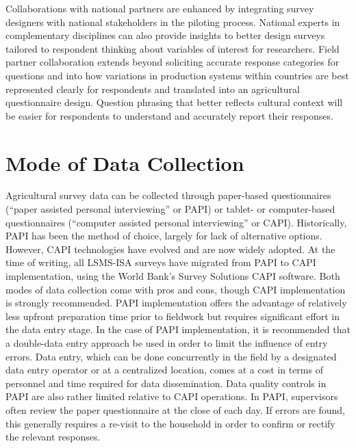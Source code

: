 \documentclass[
]{book}
\begin{document}
Collaborations with national partners are enhanced by integrating survey designers with national stakeholders in the piloting process. National experts in complementary disciplines can also provide insights to better design surveys tailored to respondent thinking about variables of interest for researchers. Field partner collaboration extends beyond soliciting accurate response categories for questions and into how variations in production systems within countries are best represented clearly for respondents and translated into an agricultural questionnaire design. Question phrasing that better reflects cultural context will be easier for respondents to understand and accurately report their responses.

\hypertarget{mode-of-data-collection}{%
\section{Mode of Data Collection}\label{mode-of-data-collection}}

Agricultural survey data can be collected through paper-based questionnaires (``paper assisted personal interviewing'' or PAPI) or tablet- or computer-based questionnaires (``computer assisted personal interviewing'' or CAPI). Historically, PAPI has been the method of choice, largely for lack of alternative options. However, CAPI technologies have evolved and are now widely adopted. At the time of writing, all LSMS-ISA surveys have migrated from PAPI to CAPI implementation, using the World Bank's Survey Solutions CAPI software. Both modes of data collection come with pros and cons, though CAPI implementation is strongly recommended. PAPI implementation offers the advantage of relatively less upfront preparation time prior to fieldwork but requires significant effort in the data entry stage. In the case of PAPI implementation, it is recommended that a double-data entry approach be used in order to limit the influence of entry errors. Data entry, which can be done concurrently in the field by a designated data entry operator or at a centralized location, comes at a cost in terms of personnel and time required for data dissemination. Data quality controls in PAPI are also rather limited relative to CAPI operations. In PAPI, supervisors often review the paper questionnaire at the close of each day. If errors are found, this generally requires a re-visit to the household in order to confirm or rectify the relevant responses.
\end{document}
